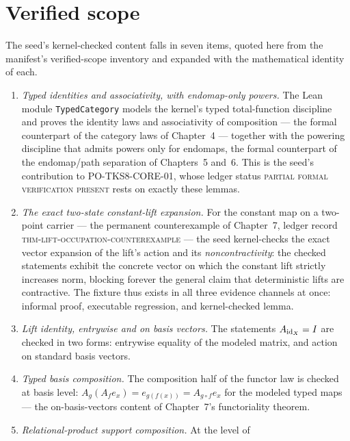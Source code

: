 \section{Verified scope}\label{ch11:sec:verified}

The seed's kernel-checked content falls in seven items, quoted here from
the manifest's verified-scope inventory and expanded with the
mathematical identity of each.

\begin{enumerate}
\item \emph{Typed identities and associativity, with endomap-only
      powers.} The Lean module \texttt{TypedCategory} models the kernel's
      typed total-function discipline and proves the identity laws and
      associativity of composition --- the formal counterpart of the
      category laws of Chapter~4 --- together with the powering
      discipline that admits powers only for endomaps, the formal
      counterpart of the endomap/path separation of Chapters~5 and~6.
      This is the seed's contribution to PO-TKS8-CORE-01, whose ledger
      status \textsc{partial formal verification present} rests on
      exactly these lemmas.
\item \emph{The exact two-state constant-lift expansion.} For the
      constant map on a two-point carrier --- the permanent
      counterexample of Chapter~7, ledger record
      \textsc{thm-lift-occupation-counterexample} --- the seed
      kernel-checks the exact vector expansion of the lift's action and
      its \emph{noncontractivity}: the checked statements exhibit the
      concrete vector on which the constant lift strictly increases
      norm, blocking forever the general claim that deterministic lifts
      are contractive. The fixture thus exists in all three evidence
      channels at once: informal proof, executable regression, and
      kernel-checked lemma.
\item \emph{Lift identity, entrywise and on basis vectors.} The
      statements $A_{\mathrm{id}_X} = I$ are checked in two forms: entrywise
      equality of the modeled matrix, and action on standard basis
      vectors.
\item \emph{Typed basis composition.} The composition half of the
      functor law is checked at basis level:
      $A_g(A_f e_x) = e_{g(f(x))} = A_{g\circ f} e_x$ for the modeled
      typed maps --- the on-basis-vectors content of
      Chapter~7's functoriality theorem.
\item \emph{Relational-product support composition.} At the level of

\end{enumerate}
